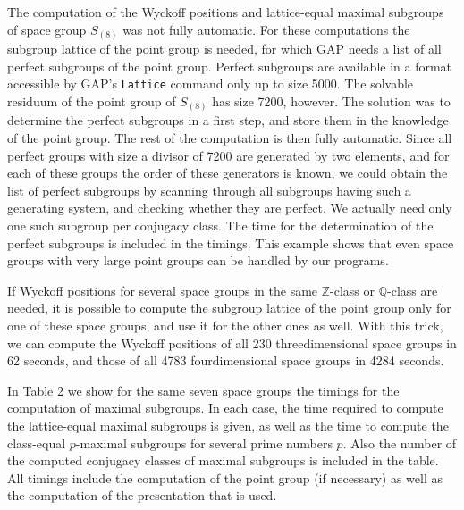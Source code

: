 \documentclass[12pt]{amsart}
\newcommand{\Q}{{\mathbb Q}}
\newcommand{\Z}{{\mathbb Z}}
\newcommand{\GAP}{{\sf GAP}}
\begin{document}
The computation of the Wyckoff positions and lattice-equal 
maximal subgroups of space group $S_{(8)}$ was not fully
automatic. For these computations the subgroup lattice of the 
point group is needed, for which {\GAP} needs a list of all perfect 
subgroups of the point group. Perfect subgroups are available in a 
format accessible by {\GAP}'s {\tt Lattice} command only up to size 5000.
The solvable residuum of the point group of $S_{(8)}$ has size 7200, 
however. The solution was to determine the perfect subgroups in a 
first step, and store them in the knowledge of the point group.
The rest of the computation is then fully automatic.
Since all perfect groups with size a divisor of 7200 are generated 
by two elements, and for each of these groups the order of these 
generators is known, we could obtain the list of perfect subgroups
by scanning through all subgroups having such a generating system,
and checking whether they are perfect. We actually need only one 
such subgroup per conjugacy class. The time for the determination
of the perfect subgroups is included in the timings. This example 
shows that even space groups with very large point groups can be 
handled by our programs.

If Wyckoff positions for several space groups in the same $\Z$-class 
or $\Q$-class are needed, it is possible to compute the subgroup
lattice of the point group only for one of these space groups, and 
use it for the other ones as well. With this trick, we can compute 
the Wyckoff positions of all 230 threedimensional space groups in 
62 seconds, and those of all 4783 fourdimensional space groups in 
4284 seconds.

In Table 2 we show for the same seven space groups the timings for 
the computation of maximal subgroups. In each case, the time required
to compute the lattice-equal maximal subgroups is given, as well
as the time to compute the class-equal $p$-maximal subgroups for
several prime numbers $p$. Also the number of the computed
conjugacy classes of maximal subgroups is included in the table.
All timings include the computation of the point group (if necessary) 
as well as the computation of the presentation that is used.
\end{document}
